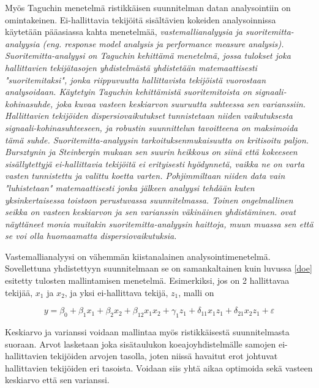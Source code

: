 \documentclass[12pt,a4paper,finnish]{tutthesis}
\begin{document}
Myös Taguchin menetelmä ristikkäisen suunnitelman datan analysointiin on
omintakeinen. Ei-hallittavia tekijöitä sisältävien kokeiden analysoinnissa
käytetään pääasiassa kahta menetelmää, \em vastemallianalyysia \em ja \em suoritemitta-analyysia \em
(eng. response model analysis ja performance measure analysis).
Suoritemitta-analyysi on Taguchin kehittämä menetelmä, jossa
tulokset joka hallittavien tekijätasojen yhdistelmästä yhdistetään matemaattisesti
"suoritemitaksi", jonka riippuvuutta hallittavista tekijöistä vuorostaan
analysoidaan. Käytetyin Taguchin kehittämistä suoritemitoista on
\em signaali-kohinasuhde, \em joka kuvaa vasteen keskiarvon suuruutta suhteessa
sen varianssiin. Hallittavien tekijöiden dispersiovaikutukset tunnistetaan
niiden vaikutuksesta signaali-kohinasuhteeseen, ja robustin suunnittelun
tavoitteena on maksimoida tämä suhde.
Suoritemitta-analyysin tarkoituksenmukaisuutta on kritisoitu paljon.
Bursztynin ja Steinbergin \parencite*{Bursztyn} mukaan sen suurin heikkous on siinä että
kokeeseen sisällytettyjä ei-hallittavia tekijöitä ei
erityisesti hyödynnetä,
vaikka ne on varta vasten tunnistettu ja valittu koetta varten. Pohjimmiltaan
niiden data vain "luhistetaan" matemaattisesti jonka jälkeen analyysi
tehdään kuten yksinkertaisessa toistoon perustuvassa suunnitelmassa.
Toinen ongelmallinen seikka on vasteen keskiarvon ja sen varianssin
väkinäinen yhdistäminen.
\textcite{box1988,steinberg1994} ovat näyttäneet monia muitakin suoritemitta-analyysin
haittoja, muun muassa sen että se voi olla huomaamatta dispersiovaikutuksia.

Vastemallianalyysi on vähemmän kiistanalainen analysointimenetelmä.
Sovellettuna yhdistettyyn suunnitelmaan se on samankaltainen kuin
luvussa \ref{doe} esitetty tulosten mallintamisen
menetelmä. Esimerkiksi, jos on 2 hallittavaa tekijää, $x_1$ ja $x_2$, ja yksi
ei-hallittava tekijä, $z_1$, malli on

\begin{equation}
  \label{eq:vastemalli}
 y = \beta _0 + \beta _{1}x_1 + \beta _{2}x_2 + \beta _{12}x_{1}x_{2} + \gamma _{1}z_1 + \delta _{11}x_{1}z_{1} + \delta _{21}x_{2}z_1 + \varepsilon
\end{equation}

Keskiarvo ja varianssi voidaan mallintaa myös ristikkäisestä suunnitelmasta suoraan.
Arvot lasketaan joka sisätaulukon koeajoyhdistelmälle
samojen ei-hallittavien tekijöiden arvojen tasolla,
joten niissä havaitut erot johtuvat hallittavien tekijöiden eri tasoista. Voidaan
siis yhtä aikaa optimoida sekä vasteen keskiarvo että sen varianssi.
\end{document}
